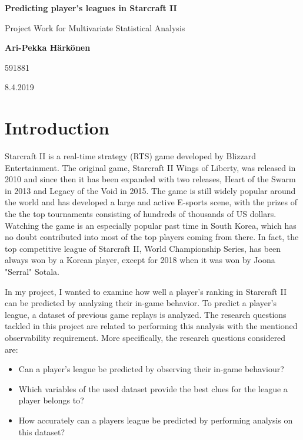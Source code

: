 \documentclass{article}
\begin{document}
\begin{titlepage}
\begin{center}
\vspace*{1cm}
 
\huge
\textbf{Predicting player's leagues in Starcraft II}
 
\vspace{2cm}
Project Work for Multivariate Statistical Analysis
 
\vspace{1cm}
 
\textbf{Ari-Pekka Härkönen}
       
591881



8.4.2019
\vfill
 
\vspace{0.8cm}
 
\end{center}
\end{titlepage}


\section{Introduction}
Starcraft II is a real-time strategy (RTS) game developed by Blizzard Entertainment. The original game, Starcraft II Wings of Liberty, was released in 2010 and since then it has been expanded with two releases, Heart of the Swarm in 2013 and Legacy of the Void in 2015. The game is still widely popular around the world and has developed a large and active E-sports scene, with the prizes of the the top tournaments consisting of hundreds of thousands of US dollars. Watching the game is an especially popular past time in South Korea, which has no doubt contributed into most of the top players coming from there. In fact, the top competitive league of Starcraft II, World Championship Series, has been always won by a Korean player, except for 2018 when it was won by Joona "Serral" Sotala.

In my project, I wanted to examine how well a player's ranking in Starcraft II can be predicted by analyzing their in-game behavior. To predict a player's league, a dataset of previous game replays is analyzed. The research questions tackled in this project are related to performing this analysis with the mentioned observability requirement. More specifically, the research questions considered are:

\begin{itemize}
    \item Can a player's league be predicted by observing their in-game behaviour?
    \item Which variables of the used dataset provide the best clues for the league a player belongs to?
    \item How accurately can a players league be predicted by performing analysis on this dataset?
\end{itemize}
\end{document}
